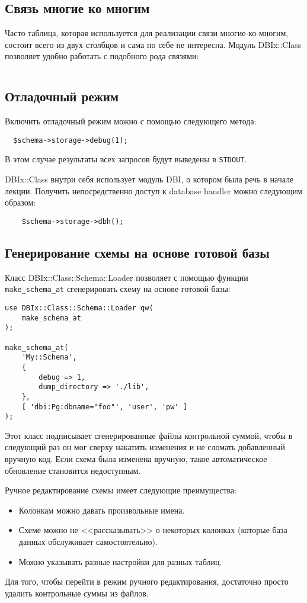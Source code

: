 \subsection{Связь многие ко многим}

Часто таблица, которая используется для реализации связи многие-ко-многим, состоит всего из двух столбцов и сама по себе не интересна. Модуль DBIx::Class позволяет удобно работать с подобного рода связями:
\begin{verbatim}
\end{verbatim}

\subsection{Отладочный режим}
Включить отладочный режим можно с помощью следующего метода:
\begin{verbatim}
  $schema->storage->debug(1);
\end{verbatim}
В этом случае результаты всех запросов будут выведены в \verb|STDOUT|.

DBIx::Class внутри себя использует модуль DBI, о котором была речь в начале лекции. Получить непосредственно доступ к database handler можно следующим образом:
\begin{verbatim}
    $schema->storage->dbh();
\end{verbatim}

\subsection{Генерирование схемы на основе готовой базы} %
Класс DBIx::Class::Schema::Loader позволяет с помощью функции \verb|make_schema_at| сгенерировать схему на основе готовой базы:
\begin{verbatim}
use DBIx::Class::Schema::Loader qw(
    make_schema_at
);

make_schema_at(
    'My::Schema',
    {
        debug => 1,
        dump_directory => './lib',
    },
    [ 'dbi:Pg:dbname="foo"', 'user', 'pw' ]
);
\end{verbatim}
Этот класс подписывает сгенерированные файлы контрольной суммой, чтобы в следующий раз он мог сверху накатить изменения и не сломать добавленный вручную код. Если схема была изменена вручную, такое автоматическое обновление становится недоступным.

Ручное редактирование схемы имеет следующие преимущества:
\begin{itemize}
  \item Колонкам можно давать произвольные имена.
  \item Схеме можно не <<рассказывать>> о некоторых колонках (которые база данных обслуживает самостоятельно).
  \item Можно указывать разные настройки для разных таблиц.
\end{itemize}
Для того, чтобы перейти в режим ручного редактирования, достаточно просто удалить контрольные суммы из файлов.

